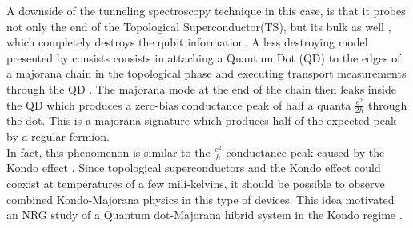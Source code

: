 A downside of the tunneling spectroscopy technique in this case, is
that it probes not only the end of the Topological Superconductor(TS), but its bulk as well ,
which completely destroys the qubit information. A less destroying
model presented by \citet{liu_detecting_2011} consists consists in attaching a Quantum Dot (QD) to the edges of a majorana chain in the topological phase and executing transport measurements through the QD \cite{liu_detecting_2011} . The majorana mode at the end of the chain then leaks inside the QD \cite{vernek_subtle_2014} which produces a zero-bias conductance peak of half a quanta $\frac{e^{2}}{2h}$ through the dot. This is a majorana signature which produces half of the expected peak by a regular fermion.\\

In fact, this phenomenon is similar to the $\frac{e^{2}}{h}$ conductance peak caused by the Kondo effect \citep{hewson_kondo_1997}. Since topological superconductors and the Kondo effect could coexist at temperatures of a few mili-kelvins, it should be possible to observe combined Kondo-Majorana physics in this type of devices. This idea motivated an NRG study of a Quantum dot-Majorana hibrid system in the Kondo regime  \citep{ruiz-tijerina_interaction_2015}. \\

